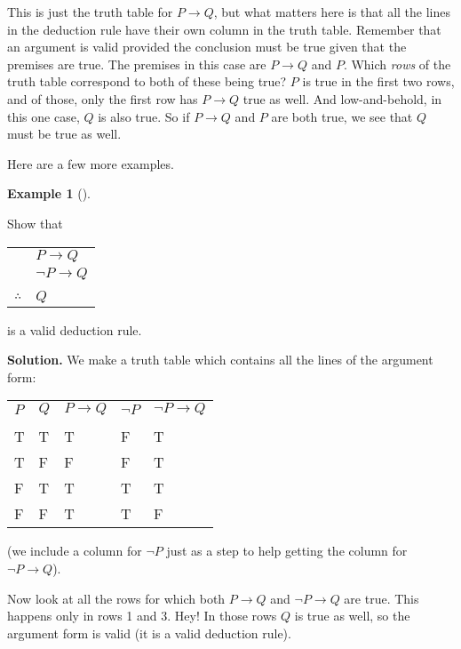 \documentclass[10pt,]{book}
\theoremstyle{plain}
\theoremstyle{definition}
\newtheorem{example}[theorem]{Example}
\theoremstyle{definition}
\theoremstyle{definition}
\numberwithin{equation}{chapter}
\newcommand{\hrulethin}  {\noalign{\hrule height 0.04em}}
\def\imp{\rightarrow}
\begin{document}
          This is just the truth table for \(P \imp Q\), but what matters here is that all the lines in the deduction rule have their own column in the truth table. Remember that an argument is valid provided the conclusion must be true given that the premises are true. The premises in this case are \(P \imp Q\) and \(P\). Which \emph{rows} of the truth table correspond to both of these being true? \(P\) is true in the first two rows, and of those, only the first row has \(P \imp Q\) true as well. And low-and-behold, in this one case, \(Q\) is also true. So if \(P\imp Q\) and \(P\) are both true, we see that \(Q\) must be true as well.
\par

          Here are a few more examples.
\begin{example}[]\label{example-85}

              Show that
\begin{tabular}{ll}
&\(P \imp Q\)\tabularnewline[0pt]
&\(\neg P \imp Q\)\tabularnewline[0pt]
&\tabularnewline\hrulethin
\(\therefore\)&\(Q\)
\end{tabular}
\par

              is a valid deduction rule.
\par\medskip\noindent%
\textbf{Solution.}\quad
              We make a truth table which contains all the lines of the argument form:
\begin{tabular}{lllll}
\(P\)&\(Q\)&\(P\imp Q\)&\(\neg P\)&\(\neg P \imp Q\)\tabularnewline[0pt]
&&&&\tabularnewline\hrulethin
T&T&T&F&T\tabularnewline[0pt]
T&F&F&F&T\tabularnewline[0pt]
F&T&T&T&T\tabularnewline[0pt]
F&F&T&T&F
\end{tabular}
\par

              (we include a column for \(\neg P\) just as a step to help getting the column for \(\neg P \imp Q\)).
\par

              Now look at all the rows for which both \(P \imp Q\) and \(\neg P \imp Q\) are true. This happens only in rows 1 and 3. Hey! In those rows \(Q\) is true as well, so the argument form is valid (it is a valid deduction rule).
\end{example}
\end{document}

